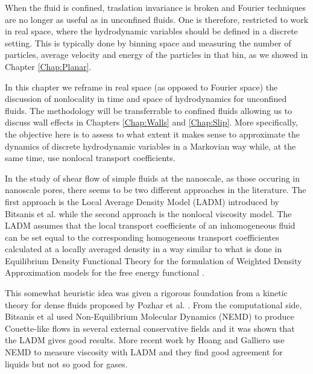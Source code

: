 \documentclass[b5paper,openright,11pt]{book}
\begin{document}
When  the  fluid is  confined,  traslation  invariance is  broken  and
Fourier  techniques  are   no  longer  as  useful   as  in  unconfined
fluids. One is therefore, restricted to  work in real space, where the
hydrodynamic variables should  be defined in a  discrete setting. This
is  typically  done by  binning  space  and  measuring the  number  of
particles, average velocity  and energy of the particles  in that bin, as we showed in Chapter \ref{Chap:Planar}.

In this chapter we reframe in  real space (as opposed
to Fourier space) the discussion of  nonlocality in time and space of
hydrodynamics for unconfined fluids. The  methodology will be  transferrable to
confined fluids allowing  us to discuss wall  effects in Chapters \ref{Chap:Walls} and \ref{Chap:Slip}.  More  specifically, the
objective  here  is  to  assess  to what  extent  it  makes  sense  to
approximate  the  dynamics of  discrete  hydrodynamic  variables in  a
Markovian  way  while,  at  the same  time,  use  nonlocal  transport
coefficients. 


In the study of shear flow of simple fluids at the nanoscale, as those
occuring  in  nanoscale  pores,  there   seems  to  be  two  different
approaches in the literature.  The first approach is the Local Average
Density Model  (LADM) introduced by Bitsanis  et al.  \cite{Bitsanis1987}
while the second  approach is the nonlocal viscosity  model. 
The LADM assumes that the local transport coefficients of an inhomogeneous
fluid can be set equal to the corresponding homogeneous transport coefficientes calculated at a locally averaged density in a way similar to what  is done in Equilibrium Density  Functional Theory for the formulation of Weighted Density  Approximation models for the free energy functional \cite{Tarazona2008}.  %

This somewhat  heuristic idea
was given a rigorous foundation from a kinetic theory for dense fluids
proposed by Pozhar et al.  \cite{Pozhar1991a}.  From the computational
side,   Bitsanis  et   al  \cite{Bitsanis1987}   used  Non-Equilibrium
Molecular  Dynamics (NEMD)  to produce  Couette-like flows  in several
external conservative fields and it was shown that the LADM gives good
results.    More     recent    work    by    Hoang     and    Galliero
\cite{Hoang2012a,Hoang2012b} use  NEMD to  measure viscosity
with LADM and they find good agreement for liquids but not so good for
gases.
\end{document}
